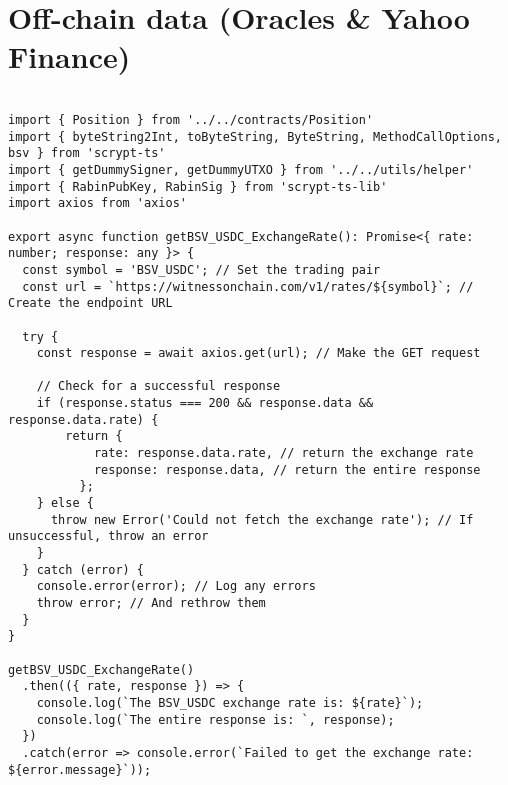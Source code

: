 \section{Off-chain data (Oracles \& Yahoo Finance)}
\label{app:oracles_yfinance}

\begin{lstlisting}[style=htmlcssjs, caption=Fetching USDC-BSV exchange rate via the WitnessOnChain Oracle Service]

import { Position } from '../../contracts/Position'
import { byteString2Int, toByteString, ByteString, MethodCallOptions, bsv } from 'scrypt-ts'
import { getDummySigner, getDummyUTXO } from '../../utils/helper'
import { RabinPubKey, RabinSig } from 'scrypt-ts-lib'
import axios from 'axios'

export async function getBSV_USDC_ExchangeRate(): Promise<{ rate: number; response: any }> {
  const symbol = 'BSV_USDC'; // Set the trading pair
  const url = `https://witnessonchain.com/v1/rates/${symbol}`; // Create the endpoint URL

  try {
    const response = await axios.get(url); // Make the GET request

    // Check for a successful response
    if (response.status === 200 && response.data && response.data.rate) {
        return {
            rate: response.data.rate, // return the exchange rate
            response: response.data, // return the entire response
          };
    } else {
      throw new Error('Could not fetch the exchange rate'); // If unsuccessful, throw an error
    }
  } catch (error) {
    console.error(error); // Log any errors
    throw error; // And rethrow them
  }
}

getBSV_USDC_ExchangeRate()
  .then(({ rate, response }) => {
    console.log(`The BSV_USDC exchange rate is: ${rate}`);
    console.log(`The entire response is: `, response);
  })
  .catch(error => console.error(`Failed to get the exchange rate: ${error.message}`));


\end{lstlisting}

